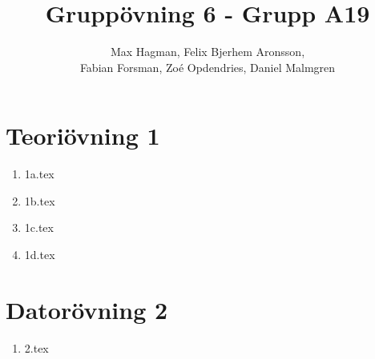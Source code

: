 \documentclass[a4paper]{report}
\title{Gruppövning 6 - Grupp A19}
\author{Max Hagman, Felix Bjerhem Aronsson,\\ Fabian Forsman, Zoé Opdendries, Daniel Malmgren}
\begin{document}
\maketitle

\section*{Teoriövning 1}
\begin{enumerate}[label=(\alph*)]
    \item {1a.tex}
    \item {1b.tex}
    \item {1c.tex}
    \item {1d.tex}
\end{enumerate}
\section*{Datorövning 2}
\begin{enumerate}[label=(\alph*)]
    \item {2.tex}
\end{enumerate}
\end{document}
